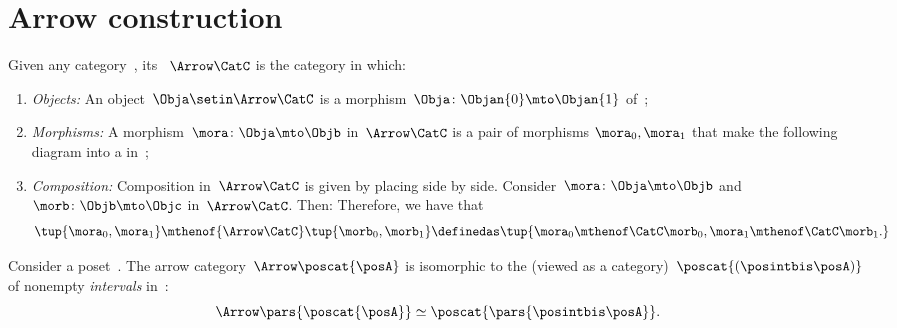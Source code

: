 
\section{Arrow construction}


\begin{ctdefinition}
    \label{def:arrow_category}
    Given any category~\CatC, its ~$\Arrow\CatC$ is the category in which:
    \begin{enumerate}
        \item \emph{Objects:} An object~$\Obja \setin \Arrow\CatC$ is a morphism~$\Obja\colon \Objan{0}\mto \Objan{1}$ of~\CatC;
        \item \emph{Morphisms:} A morphism~$\mora\colon \Obja \mto \Objb$ in~$\Arrow\CatC$ is a pair of morphisms $\mora_0,\mora_1$ that make the following diagram into a  in~\CatC;
        \item \emph{Composition:} Composition in~$\Arrow \CatC$ is given by placing  side by side.
              Consider~$\mora\colon \Obja \mto \Objb$ and~$\morb\colon \Objb \mto \Objc$ in~$\Arrow\CatC$.
              Then:
              Therefore, we have that
              \begin{equation}\label{eq:arrow-cat-composition}
                  \tup{\mora_0,\mora_1} \mthenof{\Arrow \CatC} \tup{\morb_0,\morb_1}
                  \definedas \tup{\mora_0\mthenof\CatC\morb_0, \mora_1\mthenof\CatC\morb_1.
                  }
              \end{equation}
    \end{enumerate}
\end{ctdefinition}

\begin{example}[Intervals]
    \label{exa:arrow-poset}
    Consider a poset~\posA.
    The arrow category~$\Arrow \poscat{\posA}$ is isomorphic to the  (viewed as a category)~$\poscat{\left(\posintbis\posA\right)}$ of nonempty \emph{intervals} in~\posA:
    \begin{equation}
        \Arrow \pars{\poscat{\posA}} \simeq
        \poscat{\pars{\posintbis\posA}}.
    \end{equation}
\end{example}

